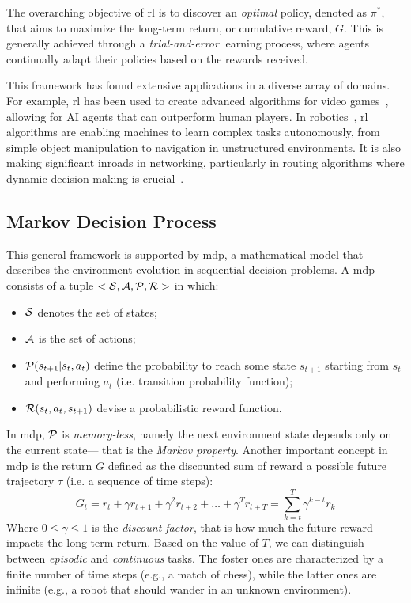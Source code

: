 The overarching objective of \ac{rl} is to discover an \emph{optimal} policy, 
 denoted as $\pi^*$, that aims to maximize the long-term return, or cumulative reward, $G$. 
 This is generally achieved through a \emph{trial-and-error} learning process, 
 where agents continually adapt their policies based on the rewards received.

This framework has found extensive applications in a diverse array of domains. 
 For example, \ac{rl} has been used to create advanced algorithms for video games~\cite{DBLP:journals/spm/ArulkumaranDBB17}, 
 allowing for AI agents that can outperform human players. 
% 
In robotics~\cite{DBLP:journals/ijrr/KoberBP13}, 
 \ac{rl} algorithms are enabling machines to learn complex tasks autonomously, 
 from simple object manipulation to navigation in unstructured environments. 
 It is also making significant inroads in networking, 
 particularly in routing algorithms where dynamic decision-making is crucial~\cite{DBLP:journals/comsur/LuongHGNWLK19}.

\subsection{Markov Decision Process}
This general framework is supported by \ac{mdp}, 
 a mathematical model that describes the environment evolution in sequential decision problems. 
%
A \ac{mdp} consists of a tuple $<\mathcal{S}, \mathcal{A}, \mathcal{P}, \mathcal{R}>$ in which:
\begin{itemize}
  \item $\mathcal{S}$ denotes the set of states;
  \item $\mathcal{A}$ is the set of actions;
  \item $\mathcal{P}(s_{t + 1} | s_t, a_t)$ define the probability to reach some state $s_{t + 1}$ starting from $s_t$ and performing $a_t$ (i.e. transition probability function);
  \item $\mathcal{R}(s_t, a_t, s_{t+1})$ devise a probabilistic reward function.
\end{itemize}
In \ac{mdp}, $\mathcal{P}$ is \emph{memory-less}, 
 namely the next environment state depends only on the current state---
 that is the \emph{Markov property}.
Another important concept in \ac{mdp} is the return 
 $G$ defined as the discounted sum of reward a possible future trajectory $\tau$ (i.e. a sequence of time steps):
\begin{equation}
G_{t} = r_t + \gamma r_{t + 1} + \gamma^2 r_{t + 2} + \dots + \gamma^T r_{t + T} = \sum_{k = t}^T \gamma^{k-t} r_k
\end{equation}
Where $0 \leq \gamma \leq 1$ is the \emph{discount factor}, 
 that is how much the future reward impacts the long-term return.
Based on the value of $T$, we can distinguish between \emph{episodic} and \emph{continuous} tasks.
 The foster ones are characterized by a finite number of time steps
  (e.g., a match of chess), while the latter ones are infinite 
  (e.g., a robot that should wander in an unknown environment).
